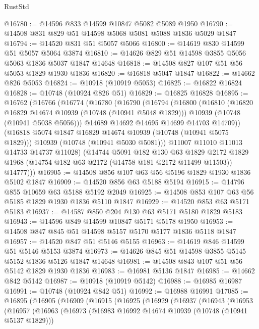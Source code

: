 \begin{lexlean}{RustStd}
\begin{coremodule}
{\begin{coremodule}
{{{{{@16780 := @14596 @833 @14599 @10847 @5082 @5089 @1950
@16790 := @14508 @831 @829 @51 @14598 @5068 @5081 @5088 @1836 @5029 @1847
@16794 := @14520 @831 @51 @5057 @5066
@16800 := @14619 @830 @14599 @51 @5057 @5064 @3874
@16810 := @14626 @829 @51 @14598 @3855 @5056 @5063 @1836 @5037 @1847 @14648
@16818 := @14508 @827 @107 @51 @56 @5053 @1829 @1930 @1836
@16820 := @16818 @5047 @1847
@16822 := @14662 @826 @5053
@16824 := @10918 (@10919 @5053)
@16825 := @16822 @16824
@16828 := @10748 (@10924 @826 @51)
@16829 := @16825 @16828
@16895 := @16762
    (@16766
      (@16774
        (@16780
          (@16790
            (@16794
              (@16800
                (@16810
                  (@16820 @16829 @14674 @10939 (@10748 (@10941 @5048 @1829)))
                  @10939
                  (@10748 (@10941 @5038 @5056)))
                @14689
                @14692
                @14695
                @14699
                @14703
                @14709))
            (@16818 @5074 @1847 @16829 @14674 @10939 (@10748 (@10941 @5075 @1829)))
            @10939
            (@10748 (@10941 @5030 @5081)))
          @11007
          @11010
          @11013
          @14733
          @14737
          @11028)
        (@14744
          @5091
          @182
          @130
          @63
          @1829
          @2172
          @1829
          @1968
          (@14754 @182 @63 @2172 (@14758 @181 @2172 @11499 @11503))
          @14777)))
@16905 := @14508 @856 @107 @63 @56 @5196 @1829 @1930 @1836 @5102 @1847
@16909 := @14520 @856 @63 @5188 @5194
@16915 := @14796 @855 @10659 @63 @5188 @5192 @2049
@16925 := @14508 @853 @107 @63 @56 @5185 @1829 @1930 @1836 @5110 @1847
@16929 := @14520 @853 @63 @5171 @5183
@16937 := @14587 @850 @204 @130 @63 @5171 @5180 @1829 @5183
@16943 := @14596 @849 @14599 @10847 @5171 @5178 @1950
@16953 := @14508 @847 @845 @51 @14598 @5157 @5170 @5177 @1836 @5118 @1847
@16957 := @14520 @847 @51 @5146 @5155
@16963 := @14619 @846 @14599 @51 @5146 @5153 @3874
@16973 := @14626 @845 @51 @14598 @3855 @5145 @5152 @1836 @5126 @1847 @14648
@16981 := @14508 @843 @107 @51 @56 @5142 @1829 @1930 @1836
@16983 := @16981 @5136 @1847
@16985 := @14662 @842 @5142
@16987 := @10918 (@10919 @5142)
@16988 := @16985 @16987
@16991 := @10748 (@10924 @842 @51)
@16992 := @16988 @16991
@17085 := @16895
    (@16905
      (@16909
        (@16915
          (@16925
            (@16929
              (@16937
                (@16943
                  (@16953
                    (@16957
                      (@16963
                        (@16973
                          (@16983 @16992 @14674 @10939 (@10748 (@10941 @5137 @1829)))
}}}}}
\end{coremodule}}
\end{coremodule}
\end{lexlean}
